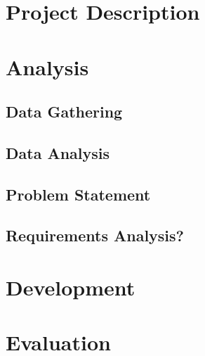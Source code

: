\part*{Project Description}



\part{Analysis}
\chapter{Data Gathering}\label{cha:DG}







\chapter{Data Analysis}\label{cha:DA}



\chapter{Problem Statement}


\chapter{Requirements Analysis?}


\part{Development}










%




\part{Evaluation}



